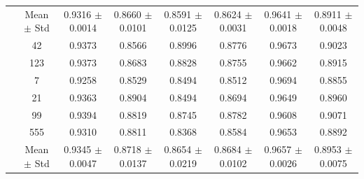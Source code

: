 \documentclass{article}
\begin{document}
\begin{table}[htbp]
{\begin{tabular}{>{\raggedright\arraybackslash}p{3.2cm}ccccccc}
			\cmidrule(lr){2-8}
			
			& Mean $\pm$ Std
			& 0.9316 $\pm$ 0.0014
			& 0.8660 $\pm$ 0.0101
			& 0.8591 $\pm$ 0.0125
			& 0.8624 $\pm$ 0.0031
			& 0.9641 $\pm$ 0.0018
			& 0.8911 $\pm$ 0.0048 \\
			
			\multirow{8}{*}{Sentence-BERT}
			& 42  & 0.9373 & 0.8566 & 0.8996 & 0.8776 & 0.9673 & 0.9023 \\
			& 123 & 0.9373 & 0.8683 & 0.8828 & 0.8755 & 0.9662 & 0.8915 \\
			& 7   & 0.9258 & 0.8529 & 0.8494 & 0.8512 & 0.9694 & 0.8855 \\
			& 21  & 0.9363 & 0.8904 & 0.8494 & 0.8694 & 0.9649 & 0.8960 \\
			& 99  & 0.9394 & 0.8819 & 0.8745 & 0.8782 & 0.9608 & 0.9071 \\
			& 555 & 0.9310 & 0.8811 & 0.8368 & 0.8584 & 0.9653 & 0.8892 \\
			
			\cmidrule(lr){2-8}
			
			& Mean $\pm$ Std
			& 0.9345 $\pm$ 0.0047
			& 0.8718 $\pm$ 0.0137
			& 0.8654 $\pm$ 0.0219
			& 0.8684 $\pm$ 0.0102
			& 0.9657 $\pm$ 0.0026
			& 0.8953 $\pm$ 0.0075 \\
			
		\end{tabular}%
	}
\end{table}

	
\end{document}
